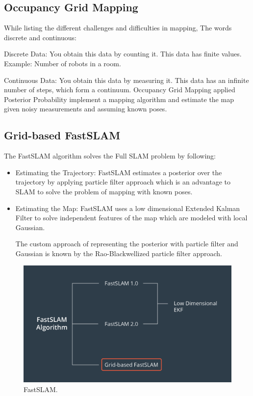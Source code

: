 \documentclass[10pt,journal,compsoc]{IEEEtran}
\begin{document}
\subsection{Occupancy Grid Mapping}
While listing the different challenges and difficulties in mapping, The words discrete and continuous:

Discrete Data: You obtain this data by counting it. This data has finite values. Example: Number of robots in a room.

Continuous Data: You obtain this data by measuring it. This data has an infinite number of steps, which form a continuum. Occupancy Grid Mapping applied Posterior Probability implement a mapping algorithm and estimate the map given noisy measurements and assuming known poses.

\subsection{Grid-based FastSLAM}
The FastSLAM algorithm solves the Full SLAM problem by following:
\begin{itemize}
\item Estimating the Trajectory: FastSLAM estimates a posterior over the trajectory by applying particle filter approach which is an advantage to SLAM to solve the problem of mapping with known poses.
\item Estimating the Map: FastSLAM uses a low dimensional Extended Kalman Filter to solve independent features of the map which are modeled with local Gaussian.

The custom approach of representing the posterior with particle filter and Gaussian is known by the Rao-Blackwellized particle filter approach.
\end {itemize}
\begin{figure}[thpb]
      \centering
      \includegraphics[width=\linewidth]{FastSLAM.png}
      \caption{FastSLAM.}
      \label{fig:robot1}
\end{figure}
\end{document}

